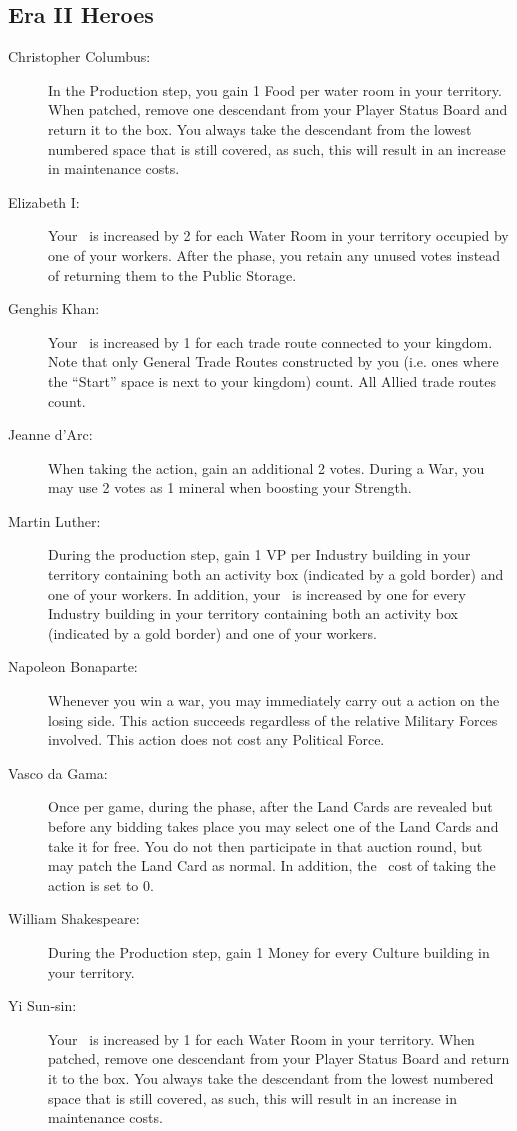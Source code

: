 \documentclass[10pt,twocolumn]{article}
\begin{document}
\begin{appendices}
\subsection{Era II Heroes}
\begin{description}
\item[Christopher Columbus:] In the Production step, you gain 1 Food per water room in your territory. When patched, remove one descendant from your Player Status Board and return it to the box. You always take the descendant from the lowest numbered space that is still covered, as such, this will result in an increase in maintenance costs.
\item[Elizabeth I:] Your \mil\ is increased by 2 for each Water Room in your territory occupied by one of your workers. After the  phase, you retain any unused votes instead of returning them to the Public Storage.
\item[Genghis Khan:] Your \mil\ is increased by 1 for each trade route connected to your kingdom. Note that only General Trade Routes constructed by you (i.e. ones where the ``Start'' space is next to your kingdom) count. All Allied trade routes count.
\item[Jeanne d'Arc:] When taking the  action, gain an additional 2 votes. During a War, you may use 2 votes as 1 mineral when boosting your Strength.
\item[Martin Luther:] During the production step, gain 1 VP per Industry building in your territory containing both an activity box (indicated by a gold border) and one of your workers. In addition, your \mil\ is increased by one for every Industry building in your territory containing both an activity box (indicated by a gold border) and one of your workers.
\item[Napoleon Bonaparte:] Whenever you win a war, you may immediately carry out a  action on the losing side. This action succeeds regardless of the relative Military Forces involved. This action does not cost any Political Force.
\item[Vasco da Gama:] Once per game, during the  phase, after the Land Cards are revealed but before any bidding takes place you may select one of the Land Cards and take it for free. You do not then participate in that auction round, but may patch the Land Card as normal. In addition, the \polf\ cost of taking the  action is set to 0.
\item[William Shakespeare:] During the Production step, gain 1 Money for every Culture building in your territory.
\item[Yi Sun-sin:] Your \mil\ is increased by 1 for each Water Room in your territory. When patched, remove one descendant from your Player Status Board and return it to the box. You always take the descendant from the lowest numbered space that is still covered, as such, this will result in an increase in maintenance costs.
\end{description}

\end{appendices}
\end{document}
